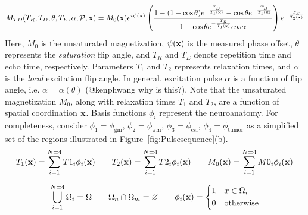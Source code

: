 \documentclass{article}         %
\theoremstyle{definition}
\theoremstyle{remark}
\begin{document}
\begin{equation}\label{mtd}
M_{TD}(T_R,T_D,\theta,T_E,\alpha,\mathcal{P},\mathbf{x})=
   M_0(\mathbf{x}) e^{i\psi(\mathbf{x})}
\left(
 \frac{1-(1-\cos \theta)e^{-\frac{T_D}{T_1(\mathbf{x})}}-\cos \theta e^{-\frac{T_D}{T_1(\mathbf{x})}}}{1-\cos \theta e^{-\frac{T_R}{T_1(\mathbf{x})}}cos \alpha}
 \right) e^{-\frac{T_E}{T_2(\mathbf{x})}}
\end{equation}
Here, $M_0$ is the unsaturated magnetization, $\psi(\mathbf{x})$ is the measured phase offset,
$\theta$ represents the \textit{saturation} flip
angle, and $T_R$ and $T_E$ denote repetition time and echo time, respectively.
Parameters $T_1$ and $T_2$ represents relaxation times, and $\alpha$ is the
\textit{local} excitation flip angle. 
In general, excitation pulse $\alpha$ is a function of flip angle, i.e.
$\alpha=\alpha(\theta)$
{\color{red}(@kenphwang why is this?)}.
Note that the unsaturated magnetization $M_0$, along with
relaxation times $T_1$ and $T_2$, are a function of spatial coordination $\mathbf{x}$.
Basis functions $\phi_i$ represent the neuroanatomy. For completeness, consider
$\phi_1 = \phi_\text{gm}$,
$\phi_2 = \phi_\text{wm}$,
$\phi_3 = \phi_\text{csf}$,
$\phi_4 = \phi_\text{tumor}$ as a simplified set 
of the regions illustrated in Figure~\ref{fig:Pulsesequence}(b).
\[
T_1(\mathbf{x})=\sum_{i=1}^{N=4} T1_i \phi_i(\mathbf{x})
\qquad
T_2(\mathbf{x})=\sum_{i=1}^{N=4} T2_i \phi_i(\mathbf{x})
\qquad
M_0(\mathbf{x})=\sum_{i=1}^{N=4} M0_i \phi_i(\mathbf{x})
\]
	
	
\[
\bigcup_{i=1}^{N=4}\Omega_i=\Omega  \qquad  \Omega_n\cap\Omega_m=\varnothing
\qquad 
\phi_i(\mathbf{x})=\left\{ \begin{split}
			1 & \quad x\in\Omega_i \\
			0 & \quad \text{otherwise}
                     \end{split} \right. 
\]
\end{document}
